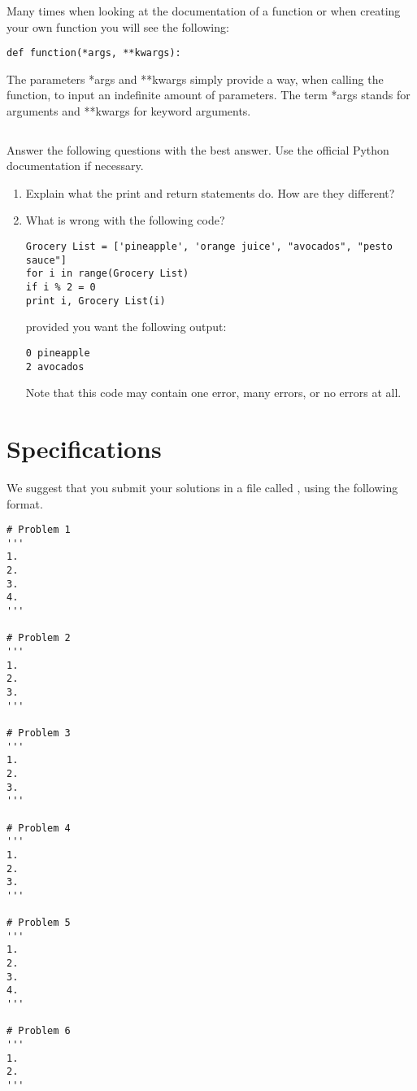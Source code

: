 \begin{example}
Many times when looking at the documentation of a function or when creating your own function you will see the following:

\begin{lstlisting}
def function(*args, **kwargs):
\end{lstlisting}

The parameters *args and **kwargs simply provide a way, when calling the function, to input an indefinite amount of parameters. The term *args stands for arguments and **kwargs for keyword arguments.  

\begin{lstlisting}

\end{lstlisting}

\end{example}

\begin{problem}
Answer the following questions with the best answer. Use the official Python documentation if necessary.

\begin{enumerate}
\item Explain what the print and return statements do. How are they different?
\item What is wrong with the following code?
\begin{lstlisting}
Grocery List = ['pineapple', 'orange juice', "avocados", "pesto sauce"]
for i in range(Grocery List)
if i % 2 = 0
print i, Grocery List(i)
\end{lstlisting}
provided you want the following output:
\begin{lstlisting}
0 pineapple
2 avocados
\end{lstlisting}
Note that this code may contain one error, many errors, or no errors at all.

\end{enumerate}
\end{problem}



\section*{Specifications}
We suggest that you submit your solutions in a file called , using the following format.
\begin{lstlisting}
# Problem 1
'''
1. 
2. 
3. 
4.  
'''

# Problem 2	
'''
1. 
2.
3.  
'''

# Problem 3
'''	
1.
2.
3.
'''

# Problem 4
'''
1. 
2. 
3. 
'''

# Problem 5
'''
1. 
2. 
3.
4.  
'''

# Problem 6
'''
1. 
2.  
'''
\end{lstlisting}	

